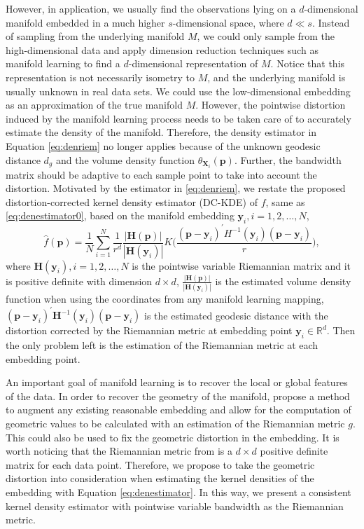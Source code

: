 \documentclass[11pt,a4paper,]{article}
\begin{document}
However, in application, we usually find the observations lying on a \(d\)-dimensional manifold embedded in a much higher \(s\)-dimensional space, where \(d \ll s\). Instead of sampling from the underlying manifold \(M\), we could only sample from the high-dimensional data and apply dimension reduction techniques such as manifold learning to find a \(d\)-dimensional representation of \(M\).
Notice that this representation is not necessarily isometry to \(M\), and the underlying manifold is usually unknown in real data sets. We could use the low-dimensional embedding as an approximation of the true manifold \(M\). However, the pointwise distortion induced by the manifold learning process needs to be taken care of to accurately estimate the density of the manifold. Therefore, the density estimator in Equation \eqref{eq:denriem} no longer applies because of the unknown geodesic distance \(d_g\) and the volume density function \(\theta_{\pmb{X}_i}(\pmb{p})\).
Further, the bandwidth matrix should be adaptive to each sample point to take into account the distortion.
Motivated by the estimator in \eqref{eq:denriem}, we restate the proposed distortion-corrected kernel density estimator (DC-KDE) of \(f\), same as \eqref{eq:denestimator0}, based on the manifold embedding \(\pmb{y}_i, i = 1, 2, \dots, N\),
\begin{equation}
\label{eq:denestimator}
\hat{f}(\pmb{p}) = \frac{1}{N} \sum_{i=1}^{N} \frac{1}{r^d} \frac{|\pmb{H}(\pmb{p})|}{|\pmb{H}(\pmb{y}_i)|} K\bigg( \frac{(\pmb{p} - \pmb{y}_i)^\prime H^{-1}(\pmb{y}_i) (\pmb{p} - \pmb{y}_i)}{r} \bigg),
\end{equation}
where \(\pmb{H}(\pmb{y}_i), i = 1, 2, \dots, N\) is the pointwise variable Riemannian matrix and it is positive definite with dimension \(d\times d\), \(\frac{|\pmb{H}(\pmb{p})|}{|\pmb{H}(\pmb{y}_i)|}\) is the estimated volume density function when using the coordinates from any manifold learning mapping, \((\pmb{p} - \pmb{y}_i)^\prime \pmb{H}^{-1}(\pmb{y}_i) (\pmb{p} - \pmb{y}_i)\) is the estimated geodesic distance with the distortion corrected by the Riemannian metric at embedding point \(\pmb{y}_i \in \mathbb{R}^d\). Then the only problem left is the estimation of the Riemannian metric at each embedding point.

An important goal of manifold learning is to recover the local or global features of the data. In order to recover the geometry of the manifold, \textcite{Perrault-Joncas2013-pq} propose a method to augment any existing reasonable embedding and allow for the computation of geometric values to be calculated with an estimation of the Riemannian metric \(g\). This could also be used to fix the geometric distortion in the embedding. It is worth noticing that the Riemannian metric from \textcite{Perrault-Joncas2013-pq} is a \(d\times d\) positive definite matrix for each data point. Therefore, we propose to take the geometric distortion into consideration when estimating the kernel densities of the embedding with Equation \eqref{eq:denestimator}. In this way, we present a consistent kernel density estimator with pointwise variable bandwidth as the Riemannian metric.
\end{document}
